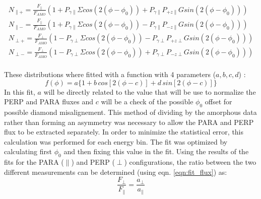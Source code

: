 \begin{eqnarray}
N_{\parallel +} = \frac{F_{\parallel}}{F_{AMO}} \left( 1 + P_{\gamma \parallel}\Sigma cos(2(\phi-\phi_0)) + P_{\gamma \parallel} P_{+z\parallel} G sin(2(\phi-\phi_0)) \right) \label{eq:N1}\\
N_{\parallel -} = \frac{F_{\parallel}}{F_{AMO}} \left( 1 + P_{\gamma \parallel}\Sigma cos(2(\phi-\phi_0)) - P_{\gamma \parallel} P_{-z\parallel} G sin(2(\phi-\phi_0)) \right) \label{eq:N2}\\
N_{\perp +} = \frac{F_{\perp}}{F_{AMO}} \left( 1 - P_{\gamma \perp}\Sigma cos(2(\phi-\phi_0)) - P_{\gamma \perp} P_{+z\perp} G sin(2(\phi-\phi_0)) \right) \label{eq:N3}\\
N_{\perp -} = \frac{F_{\perp}}{F_{AMO}} \left( 1 - P_{\gamma \perp}\Sigma cos(2(\phi-\phi_0)) + P_{\gamma \perp} P_{-z\perp} G sin(2(\phi-\phi_0)) \right) \label{eq:N4}\\
\end{eqnarray}


These distributions where fitted with a function with 4 parameters ($ a,b,c,d $) :
\begin{equation} \label{eqn:fit_flux}
f(\phi) = a \{ 1 + b\, cos[2 (\phi - c) ]  + d\, sin[2(\phi - c)] \} 
\end{equation}
In this fit, $a$ will be directly related to the value that will be use to normalize the PERP and PARA fluxes and $c$ will be a check of the possible $\phi_0$ offset for possible diamond misalignement.
This method of dividing by the amorphous data rather than forming an asymmetry was necessary to allow the PARA and PERP flux to be extracted separately. In order to minimize the statistical error, this calculation was performed for each energy bin. The fit was optimized by calculating first $\phi_0$ and then fixing this value in the fit. 
Using the results of the fits for the PARA ($\parallel$) and PERP ($\perp$) configurations, the ratio between the two different measurements can be determined (using eqn. \ref{eqn:fit_flux}) as:
\begin{equation}
\frac{F_{\perp}}{F_{\parallel}} = \frac{a_{\perp}}{a_{\parallel}}
\end{equation}


